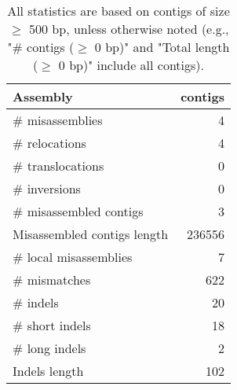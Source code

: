 \documentclass[12pt,a4paper]{article}
\begin{document}
\begin{table}[ht]
\begin{center}
\caption{All statistics are based on contigs of size $\geq$ 500 bp, unless otherwise noted (e.g., "\# contigs ($\geq$ 0 bp)" and "Total length ($\geq$ 0 bp)" include all contigs).}
\begin{tabular}{|l*{1}{|r}|}
\hline
Assembly & contigs \\ \hline
\# misassemblies & 4 \\ \hline
\hspace{5mm}\# relocations & 4 \\ \hline
\hspace{5mm}\# translocations & 0 \\ \hline
\hspace{5mm}\# inversions & 0 \\ \hline
\# misassembled contigs & 3 \\ \hline
Misassembled contigs length & 236556 \\ \hline
\# local misassemblies & 7 \\ \hline
\# mismatches & 622 \\ \hline
\# indels & 20 \\ \hline
\hspace{5mm}\# short indels & 18 \\ \hline
\hspace{5mm}\# long indels & 2 \\ \hline
Indels length & 102 \\ \hline
\end{tabular}
\end{center}
\end{table}
\end{document}
